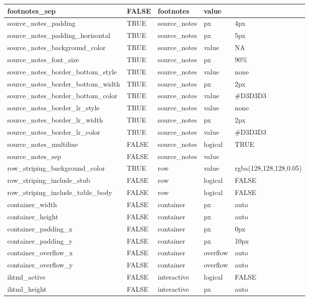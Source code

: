 \documentclass[
  letterpaper,
  DIV=11,
  numbers=noendperiod]{scrartcl}
\begin{document}
\begin{table}
{\begin{tabular}[t]{l|l|l|l|l}
\hline
footnotes\_sep & FALSE & footnotes & value & \\
\hline
source\_notes\_padding & TRUE & source\_notes & px & 4px\\
\hline
source\_notes\_padding\_horizontal & TRUE & source\_notes & px & 5px\\
\hline
source\_notes\_background\_color & TRUE & source\_notes & value & NA\\
\hline
source\_notes\_font\_size & TRUE & source\_notes & px & 90\%\\
\hline
source\_notes\_border\_bottom\_style & TRUE & source\_notes & value & none\\
\hline
source\_notes\_border\_bottom\_width & TRUE & source\_notes & px & 2px\\
\hline
source\_notes\_border\_bottom\_color & TRUE & source\_notes & value & \#D3D3D3\\
\hline
source\_notes\_border\_lr\_style & TRUE & source\_notes & value & none\\
\hline
source\_notes\_border\_lr\_width & TRUE & source\_notes & px & 2px\\
\hline
source\_notes\_border\_lr\_color & TRUE & source\_notes & value & \#D3D3D3\\
\hline
source\_notes\_multiline & FALSE & source\_notes & logical & TRUE\\
\hline
source\_notes\_sep & FALSE & source\_notes & value & \\
\hline
row\_striping\_background\_color & TRUE & row & value & rgba(128,128,128,0.05)\\
\hline
row\_striping\_include\_stub & FALSE & row & logical & FALSE\\
\hline
row\_striping\_include\_table\_body & FALSE & row & logical & FALSE\\
\hline
container\_width & FALSE & container & px & auto\\
\hline
container\_height & FALSE & container & px & auto\\
\hline
container\_padding\_x & FALSE & container & px & 0px\\
\hline
container\_padding\_y & FALSE & container & px & 10px\\
\hline
container\_overflow\_x & FALSE & container & overflow & auto\\
\hline
container\_overflow\_y & FALSE & container & overflow & auto\\
\hline
ihtml\_active & FALSE & interactive & logical & FALSE\\
\hline
ihtml\_height & FALSE & interactive & px & auto\\

\end{tabular}}
\end{table}
\end{document}
